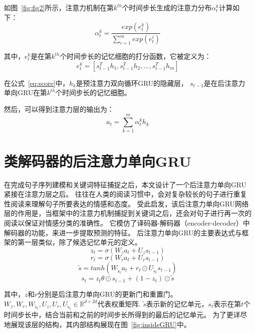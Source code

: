 如图~\ref{fig:fig2}所示，注意力机制在第${k^{th}}$个时间步长生成的注意力分布${\alpha_{t}^{k}}$计算如下：
\begin{equation}
\alpha_{t}^{k}=\frac{exp\left( e_{t}^{k} \right)}{\sum_{i=1}^{m}exp\left( e_{t}^{i} \right)}
\end{equation}

其中，${e_{t}^{k}}$是在第${k^{th}}$个时间步长的记忆细胞的打分函数，它被定义为：
\begin{equation}
e_{t}^{k}=\left[s_{t-1}^{T}h_{1},s_{t-1}^{T}h_{2},...,s_{t-1}^{T}h_{m}\right]
\label{eq:score}
\end{equation}

在公式~\ref{eq:score}中，${h_{k}}$是预注意力双向循环GRU的隐藏层，
${s_{t-1}}$是在后注意力单向GRU在第${k^{th}}$个时间步长的记忆细胞。

然后，可以得到注意力层的输出为：
\begin{equation}
a_{t}=\sum_{k=1}^{m}\alpha_{t}^{k}h_{k}
\end{equation}

\section{类解码器的后注意力单向GRU}
在完成句子序列建模和关键词特征捕捉之后，本文设计了一个后注意力单向GRU紧接在注意力层之后。
往往在人类的阅读习惯中，会对复杂较长的句子进行重复性阅读来理解句子所要表达的情感和态度。
受此启发，该后注意力单向GRU网络层的作用是，当框架中的注意力机制捕捉到关键词之后，还会对句子进行再一次的阅读以保证对情感分类的准确性。
它模仿了译码器-解码器（encoder-decoder）中解码器的功能，来进一步提取预测的特征。
后注意力单向GRU的主要表达式与框架的第一层类似，除了候选记忆单元的定义。
\begin{equation}
z_{t}=\sigma\left(W_{z}a_{t}+U_{z}s_{t-1}\right)
\end{equation}
\begin{equation}
r_{t}=\sigma\left(W_{r}a_{t}+U_{r}s_{t-1}\right)
\end{equation}
\begin{equation}
\widetilde{s}=tanh\left(W_{\widetilde{s}_{t}}a_{t} + r_{t}\odot U_{\widetilde{s}_{t}}s_{t-1}\right)
\end{equation}
\begin{equation}
s_{t}=z_{t}\theta \odot s_{t-1}+\left( 1-z_{t} \right )\odot\widetilde{s}
\end{equation}

其中，${z}$和${r}$分别是后注意力单向GRU的更新门和重置门。
${W_{z},W_{r},W_{\widetilde{s}_{t}},U_{z},U_{r},U_{\widetilde{s}_{t}}\in \mathbb{R}^{d\times2d}}$代表权重矩阵.
${\widetilde{s}}$表示新的记忆单元，${s_{t}}$表示在第${t}$个时间步长中，结合当前和之前的时间步长所得到的最后的记忆单元。
为了更详尽地展现该层的结构，其内部结构展现在图~\ref{fig:insideGRU}中。


